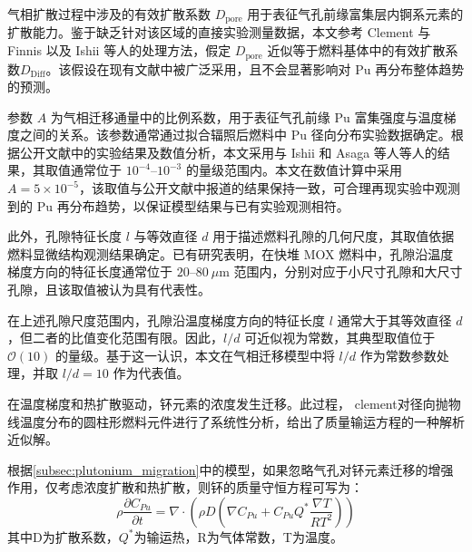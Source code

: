 气相扩散过程中涉及的有效扩散系数 $D_{\mathrm{pore}}$ 用于表征气孔前缘富集层内锕系元素的扩散能力。鉴于缺乏针对该区域的直接实验测量数据，本文参考 Clement 与 Finnis\cite{clementPlutoniumRedistributionMixed1978} 以及 Ishii\cite{ishiiInvestigationPuMigration2001} 等人的处理方法，假定 $D_{\mathrm{pore}}$ 近似等于燃料基体中的有效扩散系数$D_{\mathrm{Diff}}$。该假设在现有文献中\cite{clementPlutoniumRedistributionMixed1978,ishiiInvestigationPuMigration2001}被广泛采用，且不会显著影响对 Pu 再分布整体趋势的预测。

参数 $A$ 为气相迁移通量中的比例系数，用于表征气孔前缘 Pu 富集强度与温度梯度之间的关系。该参数通常通过拟合辐照后燃料中 Pu 径向分布实验数据确定。根据公开文献中的实验结果及数值分析，本文采用与 Ishii 和 Asaga 等人\cite{ishiiInvestigationPuMigration2001,dimarcelloModellingActinideRedistribution2014}等人的结果，其取值通常位于 $10^{-4}$--$10^{-3}$ 的量级范围内。本文在数值计算中采用 $A = 5\times10^{-5}$\footnotemark \cite{clementPlutoniumRedistributionMixed1978,ishiiInvestigationPuMigration2001,dimarcelloModellingActinideRedistribution2014}，该取值与公开文献\cite{dimarcelloModellingActinideRedistribution2014}中报道的结果保持一致，可合理再现实验中观测到的 Pu 再分布趋势，以保证模型结果与已有实验观测相符。

此外，孔隙特征长度 $l$ 与等效直径 $d$ 用于描述燃料孔隙的几何尺度，其取值依据燃料显微结构观测结果确定。已有研究表明，在快堆 MOX 燃料中，孔隙沿温度梯度方向的特征长度通常位于 $20$--$80~\mu\mathrm{m}$ 范围内，分别对应于小尺寸孔隙和大尺寸孔隙，且该取值被认为具有代表性\cite{clementPlutoniumRedistributionMixed1978, hoffmannCrackFormationCrack1974}。

在上述孔隙尺度范围内，孔隙沿温度梯度方向的特征长度 $l$ 通常大于其等效直径 $d$，但二者的比值变化范围有限。因此，$l/d$ 可近似视为常数，其典型取值位于 $\mathcal{O}(10)$ 的量级\cite{clementPlutoniumRedistributionMixed1978}。基于这一认识，本文在气相迁移模型中将 $l/d$ 作为常数参数处理，并取 $l/d = 10$ 作为代表值。

\label{sec:analytical_solution}
在温度梯度和热扩散驱动，钚元素的浓度发生迁移。此过程， clement\cite{c.f.AnalyticSolutionsMass1977}对径向抛物线温度分布的圆柱形燃料元件进行了系统性分析，给出了质量输运方程的一种解析近似解。

根据\ref{subsec:plutonium_migration}中的模型，如果忽略气孔对钚元素迁移的增强作用，仅考虑浓度扩散和热扩散，则钚的质量守恒方程可写为：
\begin{equation}
	\rho \frac{\partial C_{Pu}}{\partial t} = \nabla \cdot \left(\rho D\left(\nabla C_{Pu} + C_{Pu} Q^{*}\frac{\nabla T}{RT^{2}}\right)\right)
\end{equation}
其中D为扩散系数，$Q^{*}$为输运热，R为气体常数，T为温度。

